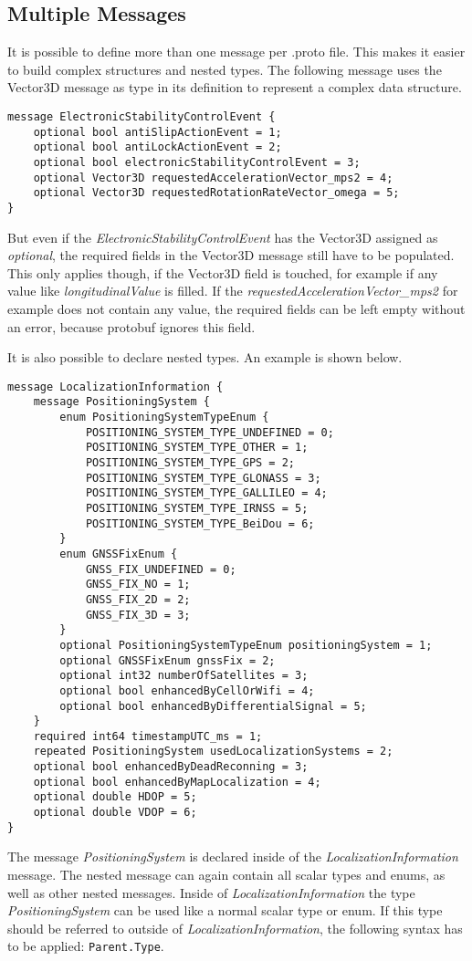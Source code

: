 \subsection{Multiple Messages}
\label{pb_multMess}
It is possible to define more than one message per .proto file. This makes it easier to build complex structures and nested types. The following message uses the Vector3D message as type in its definition to represent a complex data structure.
\begin{lstlisting}[backgroundcolor=\color{lightlightgray}, title={Using a message as type}]
message ElectronicStabilityControlEvent {
    optional bool antiSlipActionEvent = 1;
    optional bool antiLockActionEvent = 2;
    optional bool electronicStabilityControlEvent = 3;
    optional Vector3D requestedAccelerationVector_mps2 = 4;
    optional Vector3D requestedRotationRateVector_omega = 5;
}
\end{lstlisting}
But even if the \emph{ElectronicStabilityControlEvent} has the Vector3D assigned as \emph{optional}, the required fields in the Vector3D message still have to be populated. This only applies though, if the Vector3D field is touched, for example if any value like \emph{longitudinalValue} is filled. If the \emph{requestedAccelerationVector\_mps2} for example does not contain any value, the required fields can be left empty without an error, because protobuf ignores this field.\par
It is also possible to declare nested types. An example is shown below. 
\begin{lstlisting}[backgroundcolor=\color{lightlightgray}, title={Nested types}]
message LocalizationInformation {
    message PositioningSystem {
        enum PositioningSystemTypeEnum {
            POSITIONING_SYSTEM_TYPE_UNDEFINED = 0;
            POSITIONING_SYSTEM_TYPE_OTHER = 1;
            POSITIONING_SYSTEM_TYPE_GPS = 2;
            POSITIONING_SYSTEM_TYPE_GLONASS = 3;
            POSITIONING_SYSTEM_TYPE_GALLILEO = 4;
            POSITIONING_SYSTEM_TYPE_IRNSS = 5;
            POSITIONING_SYSTEM_TYPE_BeiDou = 6;
        }
        enum GNSSFixEnum {
            GNSS_FIX_UNDEFINED = 0;
            GNSS_FIX_NO = 1;
            GNSS_FIX_2D = 2;
            GNSS_FIX_3D = 3;
        }
        optional PositioningSystemTypeEnum positioningSystem = 1;
        optional GNSSFixEnum gnssFix = 2;
        optional int32 numberOfSatellites = 3;
        optional bool enhancedByCellOrWifi = 4;
        optional bool enhancedByDifferentialSignal = 5;
    }
    required int64 timestampUTC_ms = 1;
    repeated PositioningSystem usedLocalizationSystems = 2;
    optional bool enhancedByDeadReconning = 3;
    optional bool enhancedByMapLocalization = 4;
	optional double HDOP = 5;
	optional double VDOP = 6;
}
\end{lstlisting}
The message \emph{PositioningSystem} is declared inside of the \emph{LocalizationInformation} message. The nested message can again contain all scalar types and enums, as well as other nested messages. Inside of \emph{LocalizationInformation} the type \emph{PositioningSystem} can be used like a normal scalar type or enum. If this type should be referred to outside of \emph{LocalizationInformation}, the following syntax has to be applied: \verb|Parent.Type|.
